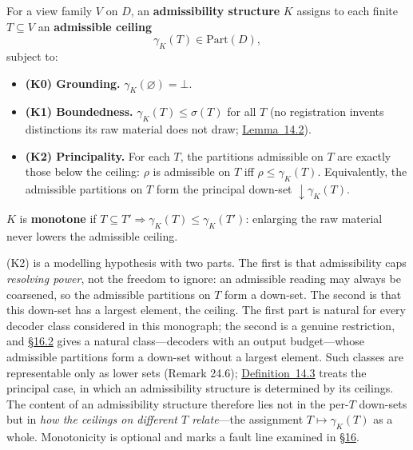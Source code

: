 \begin{thmdef}

For a view family \(V\) on \(D\), an \textbf{admissibility structure} \(K\) assigns to each finite \(T\subseteq V\) an \textbf{admissible ceiling}
\[
\gamma_K(T)\in\mathrm{Part}(D),
\]
subject to:

\begin{itemize}
\tightlist
\item
  \textbf{(K0) Grounding.} \(\gamma_K(\varnothing)=\bot\).
\item
  \textbf{(K1) Boundedness.} \(\gamma_K(T)\le\sigma(T)\) for all \(T\) (no registration invents distinctions its raw material does not draw; \hyperlink{stmt:14.2}{Lemma~14.2}).
\item
  \textbf{(K2) Principality.} For each \(T\), the partitions admissible on \(T\) are exactly those below the ceiling: \(\rho\) is admissible on \(T\) iff \(\rho\le\gamma_K(T)\). Equivalently, the admissible partitions on \(T\) form the principal down-set \({\downarrow}\gamma_K(T)\).
\end{itemize}

\(K\) is \textbf{monotone} if \(T\subseteq T'\Rightarrow\gamma_K(T)\le\gamma_K(T')\): enlarging the raw material never lowers the admissible ceiling.
\end{thmdef}

(K2) is a modelling hypothesis with two parts. The first is that admissibility caps \emph{resolving power}, not the freedom to ignore: an admissible reading may always be coarsened, so the admissible partitions on \(T\) form a down-set. The second is that this down-set has a largest element, the ceiling. The first part is natural for every decoder class considered in this monograph; the second is a genuine restriction, and \hyperlink{sec:16.2}{§16.2} gives a natural class---\hspace{0pt}decoders with an output budget---\hspace{0pt}whose admissible partitions form a down-set without a largest element. Such classes are representable only as lower sets (Remark 24.6); \hyperlink{stmt:14.3}{Definition~14.3} treats the principal case, in which an admissibility structure is determined by its ceilings. The content of an admissibility structure therefore lies not in the per-\(T\) down-sets but in \emph{how the ceilings on different \(T\) relate}---\hspace{0pt}the assignment \(T\mapsto\gamma_K(T)\) as a whole. Monotonicity is optional and marks a fault line examined in \hyperlink{sec:16}{§16}.

